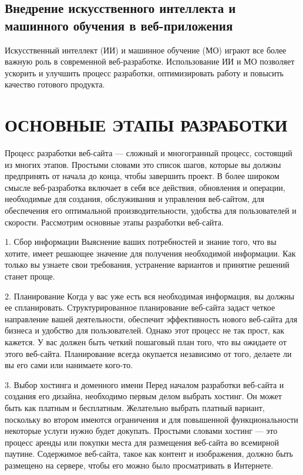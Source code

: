 \documentclass[referat, times]{SCWorks}
\begin{document}
\subsection{Внедрение искусственного интеллекта и машинного обучения в веб-приложения}
Искусственный интеллект (ИИ) и машинное обучение (МО) играют все более важную роль в современной веб-разработке. Использование ИИ и МО позволяет ускорить и улучшить процесс разработки, оптимизировать работу и повысить качество готового продукта\cite{12}.


\section{\textbf{ОСНОВНЫЕ ЭТАПЫ РАЗРАБОТКИ}}
Процесс разработки веб-сайта --- сложный и многогранный процесс,
состоящий из многих этапов. Простыми словами это список шагов, которые вы
должны предпринять от начала до конца, чтобы завершить проект.
В более широком смысле веб-разработка включает в себя все действия,
обновления и операции, необходимые для создания, обслуживания и управления
веб-сайтом, для обеспечения его оптимальной производительности, удобства для
пользователей и скорости.
Рассмотрим основные этапы разработки веб-сайта.

1. Сбор информации
Выяснение ваших потребностей и знание того, что вы хотите, имеет
решающее значение для получения необходимой информации. Как только вы
узнаете свои требования, устранение вариантов и принятие решений станет
проще.

2. Планирование
Когда у вас уже есть вся необходимая информация, вы должны ее
спланировать. Структурированное планирование веб-сайта задаст четкое
направление вашей деятельности, обеспечит эффективность нового веб-сайта
для бизнеса и удобство для пользователей. Однако этот процесс не так прост, как
кажется.
У вас должен быть четкий пошаговый план того, что вы ожидаете от этого
веб-сайта. Планирование всегда окупается независимо от того, делаете ли вы его
сами или нанимаете кого-то.

3. Выбор хостинга и доменного имени
Перед началом разработки веб-сайта и создания его дизайна, необходимо
первым делом выбрать хостинг. Он может быть как платным и бесплатным.
Желательно выбрать платный вариант, поскольку во втором имеются
ограничения и для повышенной функциональности некоторые услуги нужно
будет докупать.
Простыми словами хостинг --- это процесс аренды или покупки места для
размещения веб-сайта во всемирной паутине. Содержимое веб-сайта, такое как
контент и изображения, должно быть размещено на сервере, чтобы его можно
было просматривать в Интернете.
\end{document}
